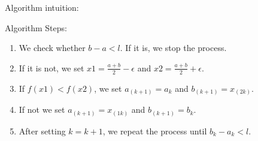 Algorithm intuition:


Algorithm Steps:
\begin{enumerate}
    \item We check whether $b - a < l$. If it is, we stop the process.
    \item If it is not, we set $x1=\frac{a+b}{2}-\epsilon$ and $x2=\frac{a+b}{2}+\epsilon$.
    \item If $f(x1) < f(x2)$, we set $a_(k+1)=a_k$ and $b_(k+1)=x_(2k)$.
    \item If not we set $a_(k+1)=x_(1k)$ and $b_(k+1)=b_k$.
    \item After setting $k=k+1$, we repeat the process until $b_k - a_k < l$.
\end{enumerate}